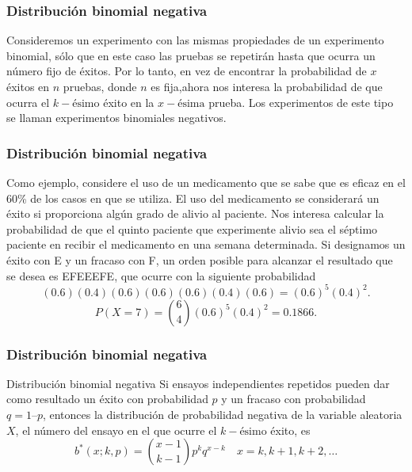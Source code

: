 \documentclass[spanish]{beamer}
\begin{document}
\begin{frame}
\frametitle{Distribución  binomial negativa}  

Consideremos un experimento con las mismas propiedades de un experimento binomial,
sólo que en este caso las pruebas se repetirán hasta que ocurra un número fijo de éxitos.
Por lo tanto, en vez de encontrar la probabilidad de $x$ éxitos en $n$ pruebas, donde $n$ es fija,ahora nos interesa la probabilidad de que ocurra el $k-\text{ésimo}$ éxito en la $x-\text{ésima}$ prueba. Los experimentos de este tipo se llaman experimentos binomiales negativos.

\end{frame}

\begin{frame}
\frametitle{Distribución  binomial negativa}  

Como ejemplo, considere el uso de un medicamento que se sabe que es eficaz en
el 60\% de los casos en que se utiliza. El uso del medicamento se considerará un éxito si
proporciona algún grado de alivio al paciente. Nos interesa calcular la probabilidad de
que el quinto paciente que experimente alivio sea el séptimo paciente en recibir el medicamento en una semana determinada. Si designamos un éxito con E y un fracaso con F,
un orden posible para alcanzar el resultado que se desea es EFEEEFE, que ocurre con
la siguiente probabilidad
\begin{equation*}
(0.6) (0.4) (0.6) (0.6) (0.6) (0.4) (0.6) = (0.6)^5 (0.4)^2 .
\end{equation*}
\begin{equation*}
P (X = 7) = \binom{6}{4}(0.6)^5 (0.4)^2 = 0.1866.
\end{equation*}
\end{frame}

\begin{frame}
\frametitle{Distribución  binomial negativa}  
\begin{block}{Distribución binomial negativa}
Si ensayos independientes repetidos pueden dar como resultado un éxito con probabilidad $p$ y un fracaso con probabilidad $q = 1 – p$, entonces la distribución de probabilidad negativa de la variable aleatoria $X$, el número del ensayo en el que ocurre el $k-\text{ésimo}$ éxito, es
\begin{equation*}
b^{*} (x; k, p) =\binom{x - 1} {k-1}p^k q^{x-k} \quad x = k, k + 1, k + 2, \ldots
\end{equation*}
\end{block}

\end{frame}
\end{document}

